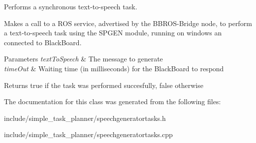 Performs a synchronous text-\/to-\/speech task. 

Makes a call to a R\+OS service, advertised by the B\+B\+R\+O\+S-\/\+Bridge node, to perform a text-\/to-\/speech task using the S\+P\+G\+EN module, running on windows an connected to Black\+Board.


\begin{DoxyParams}{Parameters}
{\em text\+To\+Speech} & The message to generate \\
\hline
{\em time\+Out} & Waiting time (in milliseconds) for the Black\+Board to respond \\
\hline
\end{DoxyParams}
\begin{DoxyReturn}{Returns}
true if the task was performed succesfully, false otherwise 
\end{DoxyReturn}


The documentation for this class was generated from the following files\+:\begin{DoxyCompactItemize}
\item 
include/simple\+\_\+task\+\_\+planner/speechgeneratortasks.\+h\item 
include/simple\+\_\+task\+\_\+planner/speechgeneratortasks.\+cpp\end{DoxyCompactItemize}
